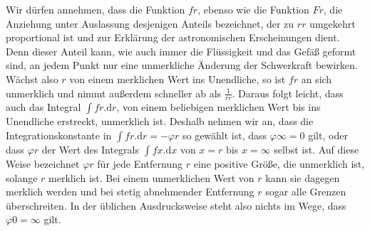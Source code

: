 Wir dürfen annehmen, dass die Funktion $fr$, ebenso wie die Funktion $Fr$, die Anziehung unter Auslassung desjenigen Anteils bezeichnet, der zu $rr$ umgekehrt proportional ist und zur Erklärung der astronomischen Erscheinungen dient. Denn dieser Anteil kann, wie auch immer die Flüssigkeit und das Gefäß geformt sind, an jedem Punkt nur eine unmerkliche Änderung der Schwerkraft bewirken. Wächst also $r$ von einem merklichen Wert ins Unendliche, so ist $fr$ an sich unmerklich und nimmt außerdem schneller ab als $\frac{1}{rr}$. Daraus folgt leicht, dass auch das Integral $\int fr.\mathrm{d}r$, von einem beliebigen merklichen Wert bis ins Unendliche erstreckt, unmerklich ist. Deshalb nehmen wir an, dass die Integrationskonstante in $\int fr.\mathrm{d}r=-\varphi r$ so gewählt ist, dass $\varphi\infty=0$ gilt, oder dass $\varphi r$ der Wert des Integrals $\int fx.\mathrm{d}x$ von $x=r$ bis $x=\infty$ selbst ist. Auf diese Weise bezeichnet $\varphi r$ für jede Entfernung $r$ eine positive Größe, die unmerklich ist, solange $r$ merklich ist. Bei einem unmerklichen Wert von $r$ kann sie dagegen merklich werden und bei stetig abnehmender Entfernung $r$ sogar alle Grenzen überschreiten. In der üblichen Ausdrucksweise steht also nichts im Wege, dass $\varphi0=\infty$ gilt.

